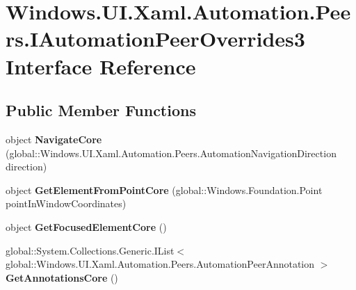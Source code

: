 \hypertarget{interface_windows_1_1_u_i_1_1_xaml_1_1_automation_1_1_peers_1_1_i_automation_peer_overrides3}{}\section{Windows.\+U\+I.\+Xaml.\+Automation.\+Peers.\+I\+Automation\+Peer\+Overrides3 Interface Reference}
\label{interface_windows_1_1_u_i_1_1_xaml_1_1_automation_1_1_peers_1_1_i_automation_peer_overrides3}
\subsection*{Public Member Functions}
\begin{DoxyCompactItemize}
\item 
\mbox{\label{interface_windows_1_1_u_i_1_1_xaml_1_1_automation_1_1_peers_1_1_i_automation_peer_overrides3_ab89d7e1926fed035b4d1e4a6ebd84e6a}} 
object {\bfseries Navigate\+Core} (global\+::\+Windows.\+U\+I.\+Xaml.\+Automation.\+Peers.\+Automation\+Navigation\+Direction direction)
\item 
\mbox{\label{interface_windows_1_1_u_i_1_1_xaml_1_1_automation_1_1_peers_1_1_i_automation_peer_overrides3_a22a573b6a3dbcdc3cda6486e9dffb748}} 
object {\bfseries Get\+Element\+From\+Point\+Core} (global\+::\+Windows.\+Foundation.\+Point point\+In\+Window\+Coordinates)
\item 
\mbox{\label{interface_windows_1_1_u_i_1_1_xaml_1_1_automation_1_1_peers_1_1_i_automation_peer_overrides3_a85c5473c92efce557199ce1f32af01fc}} 
object {\bfseries Get\+Focused\+Element\+Core} ()
\item 
\mbox{\label{interface_windows_1_1_u_i_1_1_xaml_1_1_automation_1_1_peers_1_1_i_automation_peer_overrides3_aa6a79c57927a7424350ddd2c262d71c2}} 
global\+::\+System.\+Collections.\+Generic.\+I\+List$<$ global\+::\+Windows.\+U\+I.\+Xaml.\+Automation.\+Peers.\+Automation\+Peer\+Annotation $>$ {\bfseries Get\+Annotations\+Core} ()

\end{DoxyCompactItemize}

